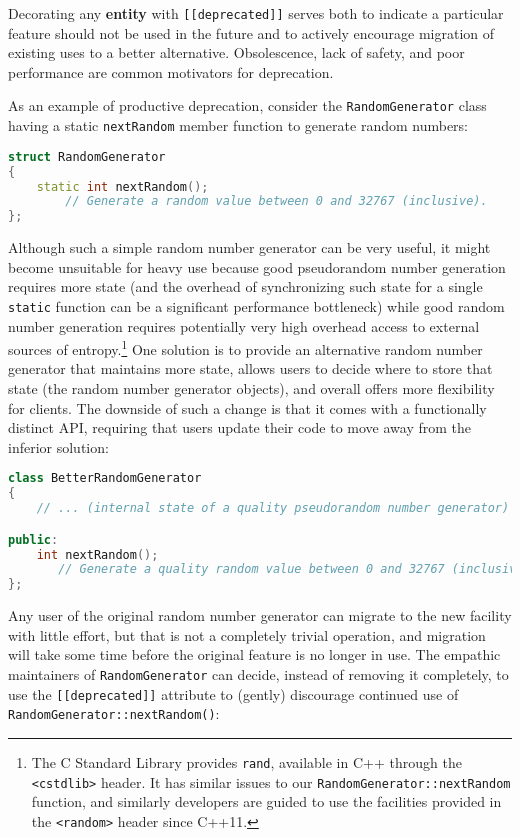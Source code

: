 Decorating any \textbf{entity} with \texttt{[[deprecated]]} serves both
to indicate a particular feature should not be used in the future and
to actively encourage migration of existing uses to a better
alternative. Obsolescence, lack of safety, and poor performance are
common motivators for deprecation.

As an example of productive deprecation, consider the
\texttt{RandomGenerator} class having a static \texttt{nextRandom}
member function to generate random numbers:

\begin{lstlisting}[language=C++]
struct RandomGenerator
{
    static int nextRandom();
        // Generate a random value between 0 and 32767 (inclusive).
};
\end{lstlisting}
    
\noindent Although such a simple random number generator can be very useful, it
might become unsuitable for heavy use because good pseudorandom number
generation requires more state (and the overhead of synchronizing such
state for a single \texttt{static} function can be a significant
performance bottleneck) while good random number generation requires
potentially very high overhead access to external sources of
entropy.{\cprotect\footnote{The C Standard Library provides
\texttt{rand}, available in C++ through the \texttt{<cstdlib>} header.
It has similar issues to our \texttt{RandomGenerator::nextRandom}
function, and similarly developers are guided to use the facilities
  provided in the \texttt{<random>} header since C++11.}} One
solution is to provide an alternative random number generator that
maintains more state, allows users to decide where to store that state
(the random number generator objects), and overall offers more
flexibility for clients. The downside of such a change is that it comes
with a functionally distinct API, requiring that users update their code
to move away from the inferior solution:

\begin{lstlisting}[language=C++]
class BetterRandomGenerator
{
    // ... (internal state of a quality pseudorandom number generator) ...

public:
    int nextRandom();
       // Generate a quality random value between 0 and 32767 (inclusive).
};
\end{lstlisting}
    
\noindent Any user of the original random number generator can migrate to the new
facility with little effort, but that is not a completely trivial
operation, and migration will take some time before the original feature is no
longer in use. The empathic maintainers of \texttt{RandomGenerator} can
decide, instead of removing it completely, to use the
\texttt{[[deprecated]]} attribute to (gently) discourage continued use
of \texttt{RandomGenerator::nextRandom()}:

